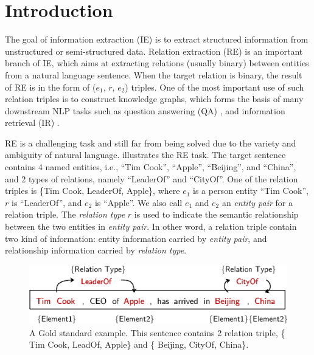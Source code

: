 \section{Introduction}

The goal of information extraction (IE) \cite{Grishman1997} is to extract
structured information
from unstructured or semi-structured data. Relation extraction (RE) \cite{Bach} is an 
important branch of IE, which aims at extracting
relations (usually binary) between entities from a natural language
sentence. When the target
relation is binary, the result of RE is in the form of ($e_1$, $r$, $e_2$) 
triples. One of the most important use of such relation triples
is to construct knowledge graphs, which forms the basis 
of many downstream NLP tasks such as question answering (QA) \cite{Bao2014}, 
and information retrieval (IR) \cite{Castells2007}.



RE is a challenging task and still far from being solved due to the 
variety and ambiguity of natural language. 
 illustrates the RE task. The target sentence contains 4 named 
entities, i.e., ``Tim Cook'', ``Apple'', ``Beijing'', and ``China'', and
2 types of relations, namely ``LeaderOf'' and ``CityOf''. One of the relation
triples is \{Tim Cook, LeaderOf, Apple\},  where $e_1$ is a person entity 
``Tim Cook'', $r$ is ``LeaderOf'', and $e_2$ is ``Apple''. We also call
$e_1$ and $e_2$ an \emph{entity pair} for a relation triple. 
The \emph{relation type} $r$ is used to indicate the semantic relationship
between the two entities in \emph{entity pair}. 
In other word, a relation triple
contain two kind of information: entity information carried by
\emph{entity pair}, and relationship information carried by
\emph{relation type}.



\begin{figure}[th]
\centering
\includegraphics[width=\columnwidth]{pictures/introduction.eps}
\caption{A Gold standard example. This sentence contains 2 relation triple, \{
  Tim Cook, LeadOf, Apple\} and \{ Beijing, CityOf, China\}.
  \label{fig:triple-eg}}
\end{figure}



